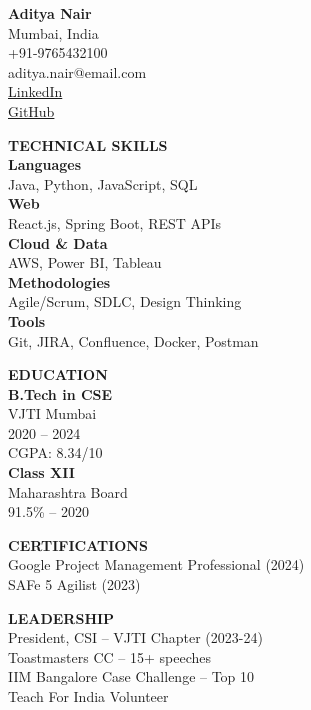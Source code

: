 \documentclass[10pt,a4paper]{article}
\begin{document}
\noindent
\begin{minipage}[t]{0.30\textwidth}
\colorbox{sidebg}{\parbox[t][\textheight][t]{\dimexpr\textwidth-8pt}{%
\vspace{8pt}
\centering
{\large\bfseries\color{accent} Aditya Nair}\\[4pt]
{\tiny Mumbai, India\\+91-9765432100\\aditya.nair@email.com\\[2pt]
\href{https://linkedin.com/in/adityanair-tech}{LinkedIn}\\
\href{https://github.com/adityanair}{GitHub}}\\[10pt]

\raggedright\hspace{4pt}\begin{minipage}{\dimexpr\textwidth-8pt}
{\bfseries\tiny\color{accent}\uppercase{Technical Skills}}\\[3pt]
{\tiny
\textbf{Languages}\\Java, Python, JavaScript, SQL\\[3pt]
\textbf{Web}\\React.js, Spring Boot, REST APIs\\[3pt]
\textbf{Cloud \& Data}\\AWS, Power BI, Tableau\\[3pt]
\textbf{Methodologies}\\Agile/Scrum, SDLC, Design Thinking\\[3pt]
\textbf{Tools}\\Git, JIRA, Confluence, Docker, Postman\\[8pt]
}

{\bfseries\tiny\color{accent}\uppercase{Education}}\\[3pt]
{\tiny
\textbf{B.Tech in CSE}\\
VJTI Mumbai\\
2020 -- 2024\\
CGPA: 8.34/10\\[4pt]
\textbf{Class XII}\\
Maharashtra Board\\
91.5\% -- 2020\\[8pt]
}

{\bfseries\tiny\color{accent}\uppercase{Certifications}}\\[3pt]
{\tiny
Google Project Management Professional (2024)\\[2pt]
SAFe 5 Agilist (2023)\\[8pt]
}

{\bfseries\tiny\color{accent}\uppercase{Leadership}}\\[3pt]
{\tiny
President, CSI -- VJTI Chapter (2023-24)\\[2pt]
Toastmasters CC -- 15+ speeches\\[2pt]
IIM Bangalore Case Challenge -- Top 10\\[2pt]
Teach For India Volunteer\\
}
\end{minipage}
}}
\end{minipage}%
\end{document}
